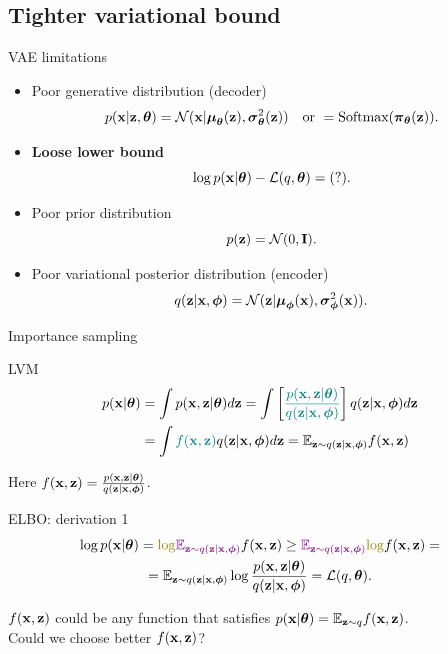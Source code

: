 \subsection{Tighter variational bound}
\begin{frame}{VAE limitations}
	\begin{itemize}
		\item Poor generative distribution (decoder)
		\[
			p(\mathbf{x} | \mathbf{z}, \boldsymbol{\theta}) = \mathcal{N}(\mathbf{x}| \boldsymbol{\mu}_{\boldsymbol{\theta}}(\mathbf{z}), \boldsymbol{\sigma}^2_{\boldsymbol{\theta}}(\mathbf{z})) \quad \text{or } = \text{Softmax}(\boldsymbol{\pi}_{\boldsymbol{\theta}}(\mathbf{z})).
		\]
		\item \textbf{Loose lower bound}
		\[
			\log p(\mathbf{x} | \boldsymbol{\theta}) - \mathcal{L}(q, \boldsymbol{\theta}) = (?).
		\]
		\item Poor prior distribution
		\[
			p(\mathbf{z}) = \mathcal{N}(0, \mathbf{I}).
		\]
		\item Poor variational posterior distribution (encoder)
		\[
			q(\mathbf{z} | \mathbf{x}, \boldsymbol{\phi}) = \mathcal{N}(\mathbf{z}| \boldsymbol{\mu}_{\boldsymbol{\phi}}(\mathbf{x}), \boldsymbol{\sigma}^2_{\boldsymbol{\phi}}(\mathbf{x})).
		\]
	\end{itemize}
\end{frame}
\begin{frame}{Importance sampling}
	\begin{block}{LVM}
		\vspace{-0.5cm}
		\begin{align*}
			p(\mathbf{x} | \boldsymbol{\theta}) &= \int p(\mathbf{x}, \mathbf{z} | \boldsymbol{\theta}) d\mathbf{z} = \int \left[{\color{teal}\frac{p(\mathbf{x}, \mathbf{z} | \boldsymbol{\theta})}{q(\mathbf{z} | \mathbf{x}, \boldsymbol{\phi})}} \right] q(\mathbf{z} | \mathbf{x}, \boldsymbol{\phi}) d\mathbf{z} \\
			&= \int {\color{teal}f(\mathbf{x}, \mathbf{z})} q(\mathbf{z} | \mathbf{x}, \boldsymbol{\phi}) d\mathbf{z} = \mathbb{E}_{\mathbf{z} \sim q(\mathbf{z} | \mathbf{x}, \boldsymbol{\phi})} f(\mathbf{x}, \mathbf{z})
		\end{align*}
	\end{block}
	Here $f(\mathbf{x}, \mathbf{z}) = \frac{p(\mathbf{x}, \mathbf{z} | \boldsymbol{\theta})}{q(\mathbf{z} | \mathbf{x}, \boldsymbol{\phi})}$.
	\begin{block}{ELBO: derivation 1}
		\vspace{-0.5cm}
		\begin{multline*}
			\log p(\bx | \btheta) = {\color{olive}\log} {\color{violet}\mathbb{E}_{\bz \sim q(\bz | \bx, \bphi)}} f(\bx, \bz)
			\geq {\color{violet}\mathbb{E}_{\bz \sim q(\bz | \bx, \bphi)}} {\color{olive}\log} f(\bx, \bz) = \\
			= \mathbb{E}_{\bz \sim q(\bz | \bx, \bphi)} \log \frac{p(\bx, \bz | \btheta)}{q(\bz | \bx, \bphi)} = \mathcal{L}(q, \btheta).
		\end{multline*}
	\end{block}
	$f(\mathbf{x}, \mathbf{z})$ could be any function that satisfies $p(\mathbf{x} | \boldsymbol{\theta})=\mathbb{E}_{\mathbf{z} \sim q} f(\mathbf{x}, \mathbf{z})$. \\
	Could we choose better $f(\mathbf{x}, \mathbf{z})$? 
\end{frame}
